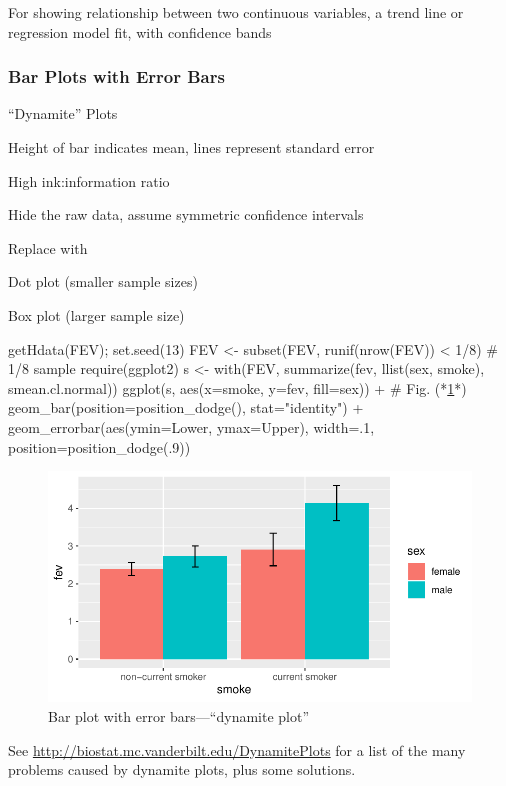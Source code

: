 \item For showing relationship between two continuous variables, a
  trend line or regression model fit, with confidence bands
\ei

\subsubsection{Bar Plots with Error Bars}

\bi
\item ``Dynamite'' Plots
\item Height of bar indicates mean, lines represent standard error
\item High ink:information ratio
\item Hide the raw data, assume symmetric confidence intervals
\item Replace with
  \bi
   \item Dot plot (smaller sample sizes)
   \item Box plot (larger sample size)
  \ei
\ei
\begin{Schunk}
\begin{Sinput}
getHdata(FEV); set.seed(13)   
FEV <- subset(FEV, runif(nrow(FEV)) < 1/8)   # 1/8 sample
require(ggplot2)
s <- with(FEV, summarize(fev, llist(sex, smoke), smean.cl.normal))
ggplot(s, aes(x=smoke, y=fev, fill=sex)) +    # Fig. (*\ref{fig:descript-dynamite}*)
    geom_bar(position=position_dodge(), stat="identity") +
    geom_errorbar(aes(ymin=Lower, ymax=Upper),
                  width=.1,
                  position=position_dodge(.9))
\end{Sinput}
\begin{figure}[htbp]

\centerline{\includegraphics[width=\maxwidth]{descript-dynamite-1} }

\caption[Bar plot with error bars---``dynamite plot'']{Bar plot with error bars---``dynamite plot''}\label{fig:descript-dynamite}
\end{figure}
\end{Schunk}
See \url{http://biostat.mc.vanderbilt.edu/DynamitePlots} for a list of
the many problems caused by dynamite plots, plus some solutions.

